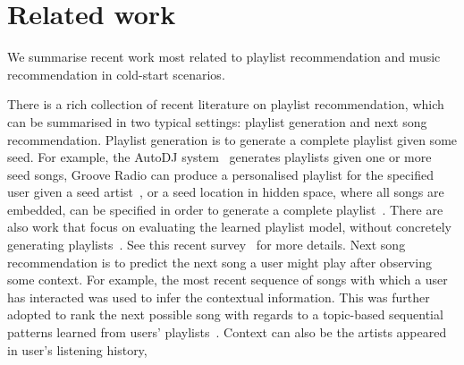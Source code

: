 \section{Related work}

We summarise recent work most related to playlist recommendation and music recommendation in cold-start 
scenarios.

There is a rich collection of recent literature on playlist recommendation,
which can be summarised in two typical settings: 
playlist generation and next song recommendation. %
Playlist generation is to generate a complete playlist given some 
seed. %
For example, the AutoDJ system~\cite{platt2002learning} generates playlists given one or more seed songs,
Groove Radio can produce a personalised playlist for the specified user given a seed artist~\cite{ben2017groove},
or a seed location in hidden space, where all songs are embedded,
can be specified in order to generate a complete playlist~\cite{chen2012playlist}.
There are also work that focus on evaluating the learned playlist model,
without concretely generating playlists~\cite{mcfee2011natural,mcfee2012hypergraph}.
See this recent survey~\cite{bonnin2015automated} for more details.
%
Next song recommendation %
is to predict the next song a user might play after observing some context.
For example, the most recent sequence of songs with which a user has interacted was used to
infer the contextual information. %
This was further adopted to rank the next possible song
with regards to a topic-based sequential patterns learned from users' playlists~\cite{hariri2012context}.
Context can also be the artists appeared in user's listening history,

